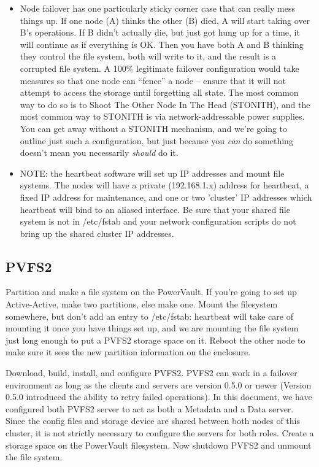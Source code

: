 \documentclass[11pt]{article}
\begin{document}
\begin{itemize}
\item Node failover has one particularly sticky corner case that can
  really mess things up.  If one node (A) thinks the other (B) died, A
  will start taking over B's operations.  If B didn't actually die, but
  just got hung up for a time, it will continue as if everything is OK.
  Then you have both A and B thinking they control the file system,
  both will write to it, and the result is a corrupted file system. A
  100\% legitimate failover configuration would take measures so that
  one node can ``fence'' a node -- ensure that it will not attempt to
  access the storage until forgetting all state.  The most common way to
  do so is to Shoot The Other Node In The Head (STONITH), and the most
  common way to STONITH is via network-addressable power supplies.  You
  can get away without a STONITH mechanism, and we're going to outline
  just such a configuration, but just because you { \em can} do something
  doesn't mean you necessarily {\em should} do it.  

\item NOTE: the heartbeat software will set up IP addresses and mount file
  systems.  The nodes will have a private (192.168.1.x) address for
  heartbeat, a fixed IP address for maintenance, and one or two
  'cluster' IP addresses which heartbeat will bind to an aliased
  interface.  Be sure that your shared file system is not in /etc/fstab
  and your network configuration scripts do not bring up the shared
  cluster IP addresses.  
\end{itemize}

\subsection{PVFS2}

Partition and make a file system on the PowerVault.  If you're going to
set up Active-Active, make two partitions, else make one.  Mount the
filesystem somewhere, but don't add an entry to /etc/fstab: heartbeat
will take care of mounting it once you have things set up, and we are
mounting the file system just long enough to put a PVFS2 storage space
on it.  Reboot the other node to make sure it sees the new partition
information on the enclosure.

Download, build, install, and configure PVFS2.  PVFS2 can work in a
failover environment as long as the clients and servers are version
0.5.0 or newer (Version 0.5.0 introduced the ability to retry failed
operations). In this document, we have configured both PVFS2 server to
act as both a Metadata and a Data server.  Since the config files and
storage device are shared between both nodes of this cluster, it is not
strictly necessary to configure the servers for both roles. Create a
storage space on the PowerVault filesystem.  Now shutdown PVFS2 and
unmount the file system.  
\end{document}
